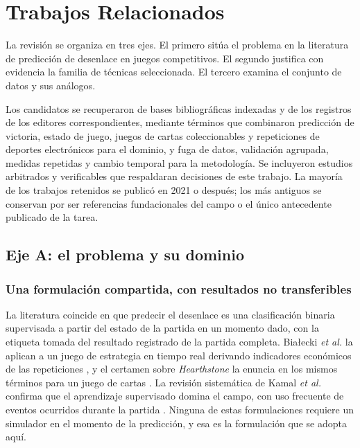 %
\section{Trabajos Relacionados}
\label{sec:relacionados}

La revisión se organiza en tres ejes. El primero sitúa el problema en la
literatura de predicción de desenlace en juegos competitivos. El segundo
justifica con evidencia la familia de técnicas seleccionada. El tercero
examina el conjunto de datos y sus análogos.

Los candidatos se recuperaron de bases bibliográficas indexadas y de los
registros de los editores correspondientes, mediante términos que combinaron
predicción de victoria, estado de juego, juegos de cartas coleccionables y
repeticiones de deportes electrónicos para el dominio, y fuga de datos,
validación agrupada, medidas repetidas y cambio temporal para la
metodología. Se incluyeron estudios arbitrados y verificables que respaldaran
decisiones de este trabajo. La mayoría de los trabajos retenidos se publicó en 2021 o
después; los más antiguos se conservan por ser referencias fundacionales del
campo o el único antecedente publicado de la tarea.

% 
% 
\subsection{Eje A: el problema y su dominio}
\label{subsec:ejea}

\subsubsection{Una formulación compartida, con resultados no transferibles}

La literatura coincide en que predecir el desenlace es
una clasificación binaria supervisada a partir del estado de la partida en un momento dado,
con la etiqueta tomada del resultado registrado de la partida completa.
Bia\l ecki \textit{et al.} la aplican a un juego de estrategia en tiempo
real derivando indicadores económicos de las repeticiones
\cite{bialecki_sc2egset_2023}, y el certamen sobre \emph{Hearthstone} la
enuncia en los mismos términos para un juego de cartas
\cite{janusz_hearthstone_2017}. La revisión sistemática de Kamal \textit{et
al.} confirma que el aprendizaje supervisado domina el campo, con uso
frecuente de eventos ocurridos durante la partida \cite{kamal_moba_2025}.
Ninguna de estas formulaciones requiere un simulador en el momento de la
predicción, y esa es la formulación que se adopta aquí.

